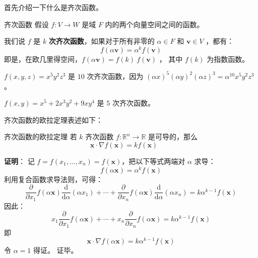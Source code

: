 
\begin{issues}
\end{issues}



首先介绍一下什么是齐次函数。

\begin{definition}{齐次函数}
假设 $f: V \to W $ 是域 $ F $ 内的两个向量空间之间的函数。

我们说 $f$ 是 $k$ \textbf{次齐次函数}，如果对于所有非零的 $\alpha \in F$ 和 $\mathbf{v} \in V$ ，都有：
\begin{equation}
f(\alpha \mathbf{v}) = \alpha^k f(\mathbf{v}) 
\end{equation}
即是，在欧几里得空间，$f(\alpha \mathbf{v}) = f(k) \ f(\mathbf{v})$ ， 其中 $f(k)$ 为指数函数。
\end{definition}

\begin{example}{}
$f(x,y,z)=x^5y^2z^3$ 是 $10$ 次齐次函数，因为 $(\alpha x)^5(\alpha y)^2(\alpha z)^3=\alpha^{10}x^5y^2z^3$。

$f(x,y)=x^5 + 2 x^3 y^2 + 9 x y^4$ 是 $5$ 次齐次函数。
\end{example}

齐次函数的欧拉定理表述如下：

\begin{theorem}{齐次函数的欧拉定理}
若 $k$ 齐次函数 $ f:\mathbb{R}^n \to \mathbb{R}$ 是可导的，那么
\begin{equation}
{\displaystyle \mathbf {x} \cdot \nabla f(\mathbf {x} )=kf(\mathbf {x} )\qquad }
\end{equation}
\end{theorem}
\textbf{证明}： 记 $f=f(x_{1},\ldots ,x_{n})=f(\mathbf {x} )$，把以下等式两端对 $\alpha$ 求导：
\begin{equation}
{\displaystyle f(\alpha \mathbf {x} )=\alpha ^{k}f(\mathbf {x} )}
\end{equation}
利用复合函数求导法则，可得：
\begin{equation}
{\frac {\partial }{\partial x_{1}}}f(\alpha \mathbf {x} ){\frac {\mathrm {d} }{\mathrm {d} \alpha }}(\alpha x_{1})+\cdots +{\frac {\partial }{\partial x_{n}}}f(\alpha \mathbf {x} ){\frac {\mathrm {d} }{\mathrm {d} \alpha }}(\alpha x_{n})=k\alpha ^{k-1}f(\mathbf {x} )
\end{equation}
因此：
\begin{equation}
x_{1}{\frac {\partial }{\partial x_{1}}}f(\alpha \mathbf {x} )+\cdots +x_{n}{\frac {\partial }{\partial x_{n}}}f(\alpha \mathbf {x} )=k\alpha ^{k-1}f(\mathbf {x} )
\end{equation}
即
\begin{equation}
\mathbf {x} \cdot \nabla f(\alpha \mathbf {x} )=k\alpha ^{k-1}f(\mathbf {x} )
\end{equation}
令 $\alpha=1$ 得证。 证毕。

